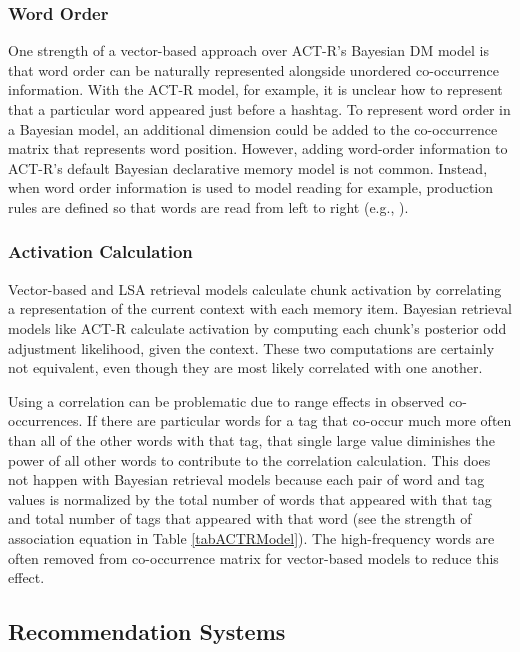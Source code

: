 \documentclass[man,floatsintext,donotrepeattitle]{apa6}
\begin{document}
\subsubsection{Word Order}

One strength of a vector-based approach over ACT-R's Bayesian DM model is that word order can be naturally represented alongside unordered co-occurrence information.
With the ACT-R model, for example, it is unclear how to represent that a particular word appeared just before a hashtag. 
To represent word order in a Bayesian model, an additional dimension could be added to the co-occurrence matrix that represents word position.
However, adding word-order information to ACT-R's default Bayesian declarative memory model is not common.
Instead, when word order information is used to model reading for example, production rules are defined so that words are read from left to right (e.g., \textcite{Lewis2006}).

\subsubsection{Activation Calculation}

Vector-based and LSA retrieval models calculate chunk activation by correlating a representation of the current context with each memory item.
Bayesian retrieval models like ACT-R calculate activation by computing each chunk's posterior odd adjustment likelihood, given the context.
These two computations are certainly not equivalent, even though they are most likely correlated with one another.

Using a correlation can be problematic due to range effects in observed co-occurrences.
If there are particular words for a tag that co-occur much more often than all of the other words with that tag, that single large value diminishes the power of all other words to contribute to the correlation calculation.
This does not happen with Bayesian retrieval models because each pair of word and tag values is normalized by the total number of words that appeared with that tag and total number of tags that appeared with that word
(see the strength of association equation in Table \ref{tabACTRModel}).
The high-frequency words are often removed from co-occurrence matrix for vector-based models to reduce this effect.

\subsection{Recommendation Systems}
\end{document}
